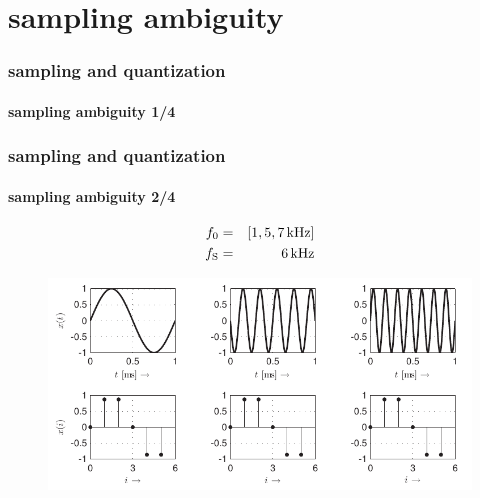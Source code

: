 	\section{sampling ambiguity}	
		\begin{frame}\frametitle{sampling and quantization}\framesubtitle{sampling ambiguity 1/4}
			\begin{center}
			\end{center}
		\end{frame}
		
		\begin{frame}\frametitle{sampling and quantization}\framesubtitle{sampling ambiguity 2/4}
			\begin{eqnarray*}
				f_0 &=& [\unit[1, 5, 7]{kHz}]\\
				f_{\mathrm{S}} &=& \unit[6]{kHz}
			\end{eqnarray*}
			\begin{figure}
				\centering
					\includegraphics[scale=.7]{graph/samplingambig}
					\label{fig:samplingambig}
			\end{figure}
		\end{frame}	
		

